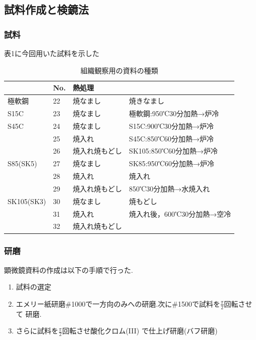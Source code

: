 \documentclass[10pt，a4j]{jsarticle}
\begin{document}
  \subsection{試料作成と検鏡法}
    \subsubsection{試料}
    表1に今回用いた試料を示した
    \begin{table}[H]
      \centering
      \caption{組織観察用の資料の種類}
        \label{my-label}
        \footnotesize
        \begin{tabular}{l|lll}
                    & No. & 熱処理     &                    \\ \hline
          極軟鋼        & 22  & 焼なまし    & 焼きなまし              \\
          S15C       & 23  & 焼なまし    & 極軟鋼:950℃30分加熱→炉冷   \\
          S45C       & 24  & 焼なまし    & S15C:900℃30分加熱→炉冷  \\
                    & 25  & 焼入れ     & S45C:850℃60分加熱→炉冷  \\
                    & 26  & 焼入れ焼もどし & SK105:850℃60分加熱→炉冷 \\
          S85(SK5)   & 27  & 焼なまし    & SK85:950℃60分加熱→炉冷  \\
                    & 28  & 焼入れ     & 焼入れ                \\
                    & 29  & 焼入れ焼もどし & 850℃30分加熱→水焼入れ     \\
          SK105(SK3) & 30  & 焼なまし    & 焼もどし               \\
                    & 31  & 焼入れ     & 焼入れ後，600℃30分加熱→空冷  \\
                    & 32  & 焼入れ焼もどし &                   
        \end{tabular}
      \end{table}
    \subsubsection{研磨}
    顕微鏡資料の作成は以下の手順で行った.
    \begin{enumerate}
      \item 試料の選定 \\
      \item エメリー紙研磨\#1000で一方向のみへの研磨.次に\#1500で試料を$\frac{\pi}{2}$回転させて
      研磨. \\
      \item さらに試料を$\frac{\pi}{2}$回転させ酸化クロム(I\hspace{-.1em}I\hspace{-.1em}I)
      で仕上げ研磨(バフ研磨) \\
    \end{enumerate}
\end{document}
